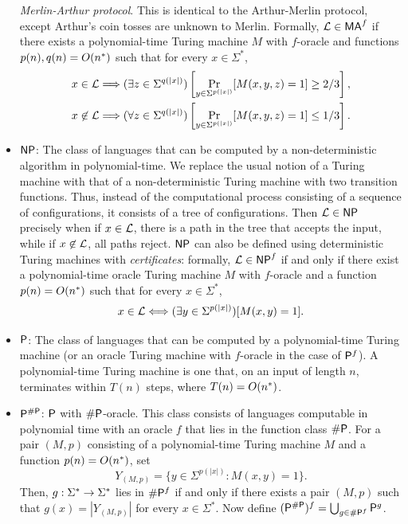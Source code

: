 \begin{itemize}
  \textit{Merlin-Arthur protocol}. This is identical to the Arthur-Merlin
  protocol, except Arthur's coin tosses are unknown to Merlin. Formally,
  $\mathcal{L}\in\mathsf{MA}^f$ if there exists a polynomial-time Turing machine $M$ with
  $f$-oracle and functions $p(n),q(n)=O(n^*)$ such that for every $x\in\Sigma^*$,
  \begin{align*}
  x\in\mathcal{L}&\Longrightarrow(\exists
  z\in\Sigma^{q(|x|)})\left[\Pr_{y\in\Sigma^{p(|x|)}}[M(x,y,z)=1]\geq
  2/3\right], \\
  x\not\in\mathcal{L}&\Longrightarrow(\forall
  z\in\Sigma^{q(|x|)})\left[\Pr_{y\in\Sigma^{p(|x|)}}[M(x,y,z)=1]\leq 1/3\right].  
  \end{align*}
\item $\mathsf{NP}$: The class of languages that can be computed by a
  non-deterministic algorithm in polynomial-time. We replace the usual notion of
  a Turing machine with that of a non-deterministic Turing machine with two
  transition functions. Thus, instead of the computational process consisting of
  a sequence of configurations, it consists of a tree of configurations. Then
  $\mathcal{L}\in\mathsf{NP}$ precisely when if $x\in\mathcal{L}$, there is a path in the tree that
  accepts the input, while if $x\not\in\mathcal{L}$, all paths reject. $\mathsf{NP}$ can also be
  defined using deterministic Turing machines with \textit{certificates}:
  formally, $\mathcal{L}\in\mathsf{NP}^f$ if and only if there exist a polynomial-time oracle
  Turing machine $M$ with $f$-oracle and a function $p(n)=O(n^*)$ such that for
  every $x\in\Sigma^*$,
  \[
  x\in\mathcal{L}\Longleftrightarrow(\exists y\in\Sigma^{p(|x|)})[M(x,y)=1].
  \]
\item $\mathsf{P}$: The class of languages that can be computed by a polynomial-time
  Turing machine (or an oracle Turing machine with $f$-oracle in the case of
  $\mathsf{P}^f$). A polynomial-time Turing machine is one that, on an input of length
  $n$, terminates within $T(n)$ steps, where $T(n)=O(n^*)$.
\item $\mathsf{P}^{\#\mathsf{P}}$: $\mathsf{P}$ with $\#\mathsf{P}$-oracle. This class consists of languages 
  computable in polynomial time with an oracle $f$ that lies in the function class 
  $\#\mathsf{P}$. For a pair $(M,p)$ consisting of a polynomial-time Turing machine $M$ 
  and a function $p(n)=O(n^*)$, set
  \[
  Y_{(M,p)}=\{y\in\Sigma^{p(|x|)}:M(x,y)=1\}.
  \]
  Then, $g:\Sigma^*\rightarrow\Sigma^*$ lies in $\#\mathsf{P}^f$ if and only if there exists a 
  pair $(M,p)$ such that $g(x)=|Y_{(M,p)}|$ for every $x\in\Sigma^*$. Now define 
  $(\mathsf{P}^{\#\mathsf{P}})^f=\bigcup_{g\in\#\mathsf{P}^f}\mathsf{P}^{g}$.
  

\end{itemize}
